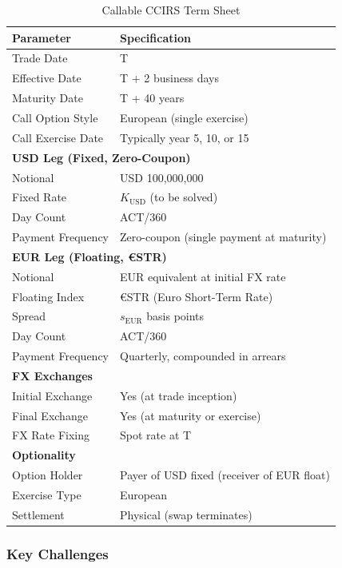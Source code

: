 \documentclass[conference]{IEEEtran}
\theoremstyle{definition}
\begin{document}
\begin{table}[ht]
\centering
\caption{Callable CCIRS Term Sheet}
\label{tab:ccirs_terms}
\begin{tabular}{ll}
\toprule
\textbf{Parameter} & \textbf{Specification} \\
\midrule
Trade Date & T \\
Effective Date & T + 2 business days \\
Maturity Date & T + 40 years \\
Call Option Style & European (single exercise) \\
Call Exercise Date & Typically year 5, 10, or 15 \\
\midrule
\multicolumn{2}{l}{\textbf{USD Leg (Fixed, Zero-Coupon)}} \\
Notional & USD 100,000,000 \\
Fixed Rate & $K_{\text{USD}}$ (to be solved) \\
Day Count & ACT/360 \\
Payment Frequency & Zero-coupon (single payment at maturity) \\
\midrule
\multicolumn{2}{l}{\textbf{EUR Leg (Floating, €STR)}} \\
Notional & EUR equivalent at initial FX rate \\
Floating Index & €STR (Euro Short-Term Rate) \\
Spread & $s_{\text{EUR}}$ basis points \\
Day Count & ACT/360 \\
Payment Frequency & Quarterly, compounded in arrears \\
\midrule
\multicolumn{2}{l}{\textbf{FX Exchanges}} \\
Initial Exchange & Yes (at trade inception) \\
Final Exchange & Yes (at maturity or exercise) \\
FX Rate Fixing & Spot rate at T \\
\midrule
\multicolumn{2}{l}{\textbf{Optionality}} \\
Option Holder & Payer of USD fixed (receiver of EUR float) \\
Exercise Type & European \\
Settlement & Physical (swap terminates) \\
\bottomrule
\end{tabular}
\end{table}

\subsubsection{Key Challenges}
\end{document}
